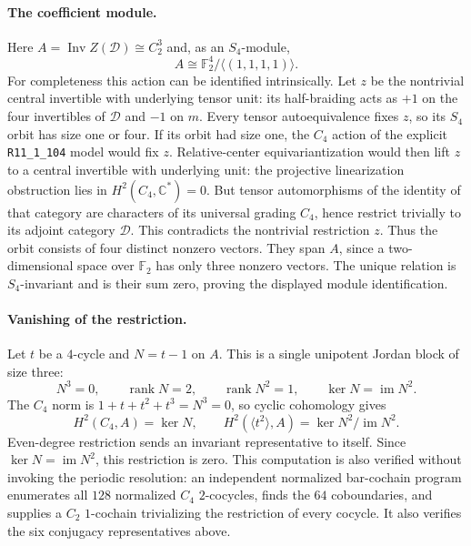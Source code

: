 \documentclass[11pt,a4paper]{article}
\begin{document}
\paragraph{The coefficient module.}
Here $A=\operatorname{Inv}Z(\mathcal D)\cong C_2^3$ and, as an $S_4$-module,
\[
 A\cong\mathbb F_2^4/\langle(1,1,1,1)\rangle.
\]
For completeness this action can be identified intrinsically. Let $z$
be the nontrivial central invertible with underlying tensor unit: its
half-braiding acts as $+1$ on the four invertibles of $\mathcal D$ and
$-1$ on $m$. Every tensor autoequivalence fixes $z$, so its $S_4$ orbit
has size one or four. If its orbit had size one, the $C_4$ action of
the explicit \texttt{R11\_1\_104} model would fix $z$.
Relative-center equivariantization \cite{CentersGraded} would then lift
$z$ to a central invertible with underlying unit: the projective
linearization obstruction lies in $H^2(C_4,\mathbb C^*)=0$.
But tensor automorphisms of the identity of that category are
characters of its universal grading $C_4$, hence restrict trivially
to its adjoint category $\mathcal D$. This contradicts the nontrivial
restriction $z$.
Thus the orbit consists of four distinct nonzero vectors. They span
$A$, since a two-dimensional space over $\mathbb F_2$ has only three
nonzero vectors. The unique relation is $S_4$-invariant and is their
sum zero, proving the displayed module identification.

\paragraph{Vanishing of the restriction.}
Let $t$ be a $4$-cycle and $N=t-1$ on $A$. This is a single unipotent
Jordan block of size three:
\[
 N^3=0,\qquad \operatorname{rank}N=2,\qquad
 \operatorname{rank}N^2=1,\qquad \ker N=\operatorname{im}N^2.
\]
The $C_4$ norm is $1+t+t^2+t^3=N^3=0$, so cyclic cohomology gives
\[
 H^2(C_4,A)=\ker N,\qquad
 H^2(\langle t^2\rangle,A)=\ker N^2/\operatorname{im}N^2.
\]
Even-degree restriction sends an invariant representative to itself.
Since $\ker N=\operatorname{im}N^2$, this restriction is zero.
This computation is also verified without invoking the periodic
resolution: an independent normalized bar-cochain program enumerates
all $128$ normalized $C_4$ $2$-cocycles, finds the $64$ coboundaries,
and supplies a $C_2$ $1$-cochain trivializing the restriction of every
cocycle. It also verifies the six conjugacy representatives above.
\end{document}
